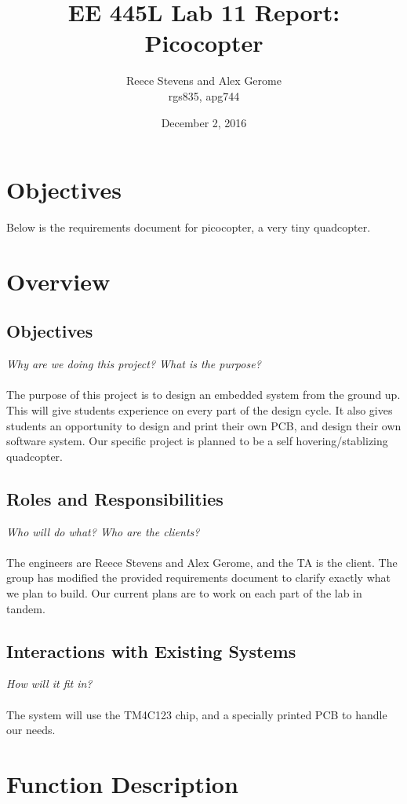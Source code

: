 \documentclass{article}
\title{EE 445L Lab 11 Report: Picocopter}
\author{Reece Stevens and Alex Gerome \\ rgs835, apg744}
\date{December 2, 2016}
\begin{document}
\maketitle

\section{Objectives}
Below is the requirements document for picocopter, a very tiny quadcopter.

\section{Overview}

\subsection{Objectives}
\textit{Why are we doing this project? What is the purpose? }\\ \\
The purpose of this project is to design an embedded system from the ground up. This will give students experience on every part of the design cycle. It also gives students an opportunity to design and print their own PCB, and design their own software system. Our specific project is planned to be a self hovering/stablizing quadcopter.

\subsection{Roles and Responsibilities}
\textit{Who will do what? Who are the clients?}\\ \\
The engineers are Reece Stevens and Alex Gerome, and the TA is the client. The group has modified the provided requirements document to clarify exactly what we plan to build. Our current plans are to work on each part of the lab in tandem.

\subsection{Interactions with Existing Systems}
\textit{How will it fit in?}\\ \\
The system will use the TM4C123 chip, and a specially printed PCB to handle our needs.


\section{Function Description}
\end{document}
